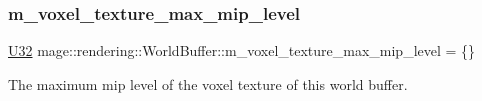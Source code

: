 \subsubsection{\texorpdfstring{m\+\_\+voxel\+\_\+texture\+\_\+max\+\_\+mip\+\_\+level}{m\_voxel\_texture\_max\_mip\_level}}
{\footnotesize\ttfamily \mbox{\hyperlink{namespacemage_aa5d6eaabaac3cdd01873d6a3d27e90f3}{U32}} mage\+::rendering\+::\+World\+Buffer\+::m\+\_\+voxel\+\_\+texture\+\_\+max\+\_\+mip\+\_\+level = \{\}}

The maximum mip level of the voxel texture of this world buffer. 